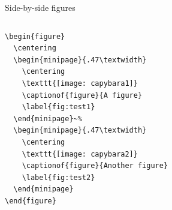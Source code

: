 \documentclass[aspectratio=169]{beamer}
\begin{document}
	\begin{frame}[fragile]{Side-by-side figures}
		\begin{center}
		\end{center}
	
	\begin{columns}
	{\tiny
		\begin{verbatim}
\begin{figure}
  \centering
  \begin{minipage}{.47\textwidth}
    \centering
    \texttt{[image: capybara1]}
    \captionof{figure}{A figure}
    \label{fig:test1}
  \end{minipage}~%
  \begin{minipage}{.47\textwidth}
    \centering
    \texttt{[image: capybara2]}
    \captionof{figure}{Another figure}
    \label{fig:test2}
  \end{minipage}
\end{figure}
		\end{verbatim}
	}



\end{columns}
\end{frame}
\end{document}
